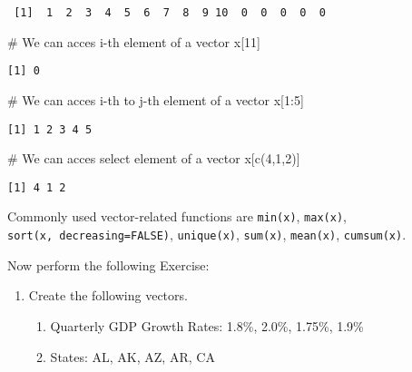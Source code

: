 \documentclass[
  letterpaper,
  DIV=11,
  numbers=noendperiod]{scrartcl}
\newenvironment{Shaded}{\begin{snugshade}}{\end{snugshade}}
\newcommand{\CommentTok}[1]{\textcolor[rgb]{0.37,0.37,0.37}{#1}}
\newcommand{\DecValTok}[1]{\textcolor[rgb]{0.68,0.00,0.00}{#1}}
\newcommand{\FunctionTok}[1]{\textcolor[rgb]{0.28,0.35,0.67}{#1}}
\newcommand{\NormalTok}[1]{\textcolor[rgb]{0.00,0.23,0.31}{#1}}
\newcommand{\SpecialCharTok}[1]{\textcolor[rgb]{0.37,0.37,0.37}{#1}}
\providecommand{\tightlist}{%
  \setlength{\itemsep}{0pt}\setlength{\parskip}{0pt}}\usepackage{longtable,booktabs,array}
\begin{document}
\begin{verbatim}
 [1]  1  2  3  4  5  6  7  8  9 10  0  0  0  0  0
\end{verbatim}

\begin{Shaded}
\begin{Highlighting}[]
\CommentTok{\# We can acces i{-}th element of a vector}
\NormalTok{x[}\DecValTok{11}\NormalTok{]}
\end{Highlighting}
\end{Shaded}

\begin{verbatim}
[1] 0
\end{verbatim}

\begin{Shaded}
\begin{Highlighting}[]
\CommentTok{\# We can acces i{-}th to j{-}th element of a vector}
\NormalTok{x[}\DecValTok{1}\SpecialCharTok{:}\DecValTok{5}\NormalTok{]}
\end{Highlighting}
\end{Shaded}

\begin{verbatim}
[1] 1 2 3 4 5
\end{verbatim}

\begin{Shaded}
\begin{Highlighting}[]
\CommentTok{\# We can acces select element of a vector}
\NormalTok{x[}\FunctionTok{c}\NormalTok{(}\DecValTok{4}\NormalTok{,}\DecValTok{1}\NormalTok{,}\DecValTok{2}\NormalTok{)]}
\end{Highlighting}
\end{Shaded}

\begin{verbatim}
[1] 4 1 2
\end{verbatim}

Commonly used vector-related functions are \texttt{min(x)},
\texttt{max(x)}, \texttt{sort(x,\ decreasing=FALSE)},
\texttt{unique(x)}, \texttt{sum(x)}, \texttt{mean(x)},
\texttt{cumsum(x)}.

Now perform the following Exercise:

\begin{enumerate}
\def\labelenumi{\arabic{enumi}.}
\tightlist
\item
  Create the following vectors.

  \begin{enumerate}
  \def\labelenumii{\alph{enumii}.}
  \tightlist
  \item
    Quarterly GDP Growth Rates: 1.8\%, 2.0\%, 1.75\%, 1.9\%
  \item
    States: AL, AK, AZ, AR, CA
  \end{enumerate}
\end{enumerate}
\end{document}
